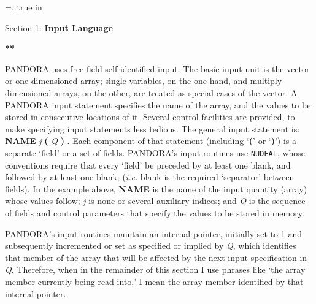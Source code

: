 %
\newtoks\footline \footline={\hss{}.\folio\hss}
\top
{} true in
\centerline{Section 1: {\bf Input Language}}
\blankline
\blankline
\centerline{\bf ***}
\blankline
\blankline
PANDORA uses free-field self-identified input. The basic input unit is the 
vector or one-dimensioned array; single variables, on the one hand, and
multiply-dimensioned arrays, on the other, are treated as special cases of
the vector. A PANDORA input statement specifies the name of the
array, and the values to be stored in consecutive locations of it. Several
control facilities are provided, to make specifying input statements less
tedious.
\blankline
The general input statement is:  {\bf NAME} {\it j} {\bf (} {\it Q} {\bf )}  .
\blankline
Each component of that statement (including `{\bf (}' or `{\bf )}')
is a separate `field' or a set of fields.
PANDORA's input routines use {\tt NUDEAL}, whose conventions require that 
every `field' be preceded by at least one blank, and followed by at least
one blank; ({\it i.e.} blank is the required `separator' between fields).
In the example above, {\bf NAME} is the name of the input quantity (array)
whose values follow; {\it j} is none or several auxiliary indices; and
{\it Q} is the sequence of fields and control parameters that specify
the values to be stored in memory.

PANDORA's input routines maintain an internal pointer, initially set to 1
and subsequently incremented or set as specified or implied by {\it Q},
which identifies that member of the array that will be affected by the
next input specification in {\it Q}. Therefore, when in the
remainder of this section
I use phrases like `the array member currently being read into,'
I mean the array member identified by that internal pointer.

